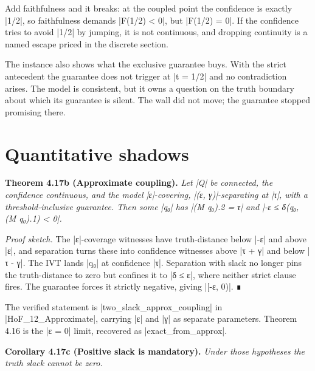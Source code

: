 \documentclass{memoir}
\begin{document}
Add faithfulness and it breaks: at the coupled point the confidence is exactly
\LeanVerb|1/2|, so faithfulness demands \LeanVerb|F(1/2) < 0|, but \LeanVerb|F(1/2) = 0|. If the confidence
tries to avoid \LeanVerb|1/2| by jumping, it is not continuous, and dropping continuity
is a named escape priced in the discrete section.

The instance also shows what the exclusive guarantee buys. With the strict
antecedent the guarantee does not trigger at \LeanVerb|t = 1/2| and no contradiction
arises. The model is consistent, but it owns a question on the truth boundary
about which its guarantee is silent. The wall did not move; the guarantee
stopped promising there.



\section{Quantitative shadows}\label{Two--Schemas--of--Impossibility-005F-005F-005F--Machine--Checked--Limits--of--Trustworthy--Machine--Learning-005F-005F-005F--and--Why--They--Tighten--with--Capability----From--Logic--to--Analysis----Quantitative--shadows}

\textbf{Theorem 4.17b (Approximate coupling).} \emph{Let \LeanVerb|Q| be connected, the confidence
continuous, and the model \LeanVerb|ε|-covering, \LeanVerb|(ε, γ)|-separating at \LeanVerb|τ|, with a
threshold-inclusive guarantee. Then some \LeanVerb|q₀| has \LeanVerb|(M q₀).2 = τ| and \LeanVerb|-ε ≤ δ(q₀, (M q₀).1) < 0|.}

\emph{Proof sketch.} The \LeanVerb|ε|-coverage witnesses have truth-distance below \LeanVerb|-ε| and above
\LeanVerb|ε|, and separation turns these into confidence witnesses above \LeanVerb|τ + γ| and
below \LeanVerb|τ - γ|. The IVT lands \LeanVerb|q₀| at confidence \LeanVerb|τ|. Separation with slack no
longer pins the truth-distance to zero but confines it to \LeanVerb|δ ≤ ε|, where
neither strict clause fires. The guarantee forces it strictly negative, giving
\LeanVerb|[-ε, 0)|. ∎

The verified statement is \LeanVerb|two_slack_approx_coupling| in \LeanVerb|HoF_12_Approximate|,
carrying \LeanVerb|ε| and \LeanVerb|γ| as separate parameters. Theorem 4.16 is the \LeanVerb|ε = 0| limit,
recovered as \LeanVerb|exact_from_approx|.

\textbf{Corollary 4.17c (Positive slack is mandatory).} \emph{Under those hypotheses the truth
slack cannot be zero.}
\end{document}
